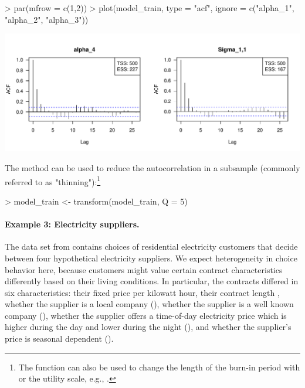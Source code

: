 \documentclass[article,shortnames]{jss}
\newcommand{\fct}[1]{\code{#1()}}
\begin{document}
\begin{Schunk}
\begin{Sinput}
> par(mfrow = c(1,2))
> plot(model_train, type = "acf", ignore = c("alpha_1", "alpha_2", "alpha_3"))
\end{Sinput}
\end{Schunk}
\includegraphics{rprobitb_oelschlaeger_bauer-model-train-acf}

The \fct{transform} method can be used to reduce the autocorrelation in a subsample (commonly referred to as "thinning"):\footnote{The function can also be used to change the length of the burn-in period with  or the utility scale, e.g., .}

\begin{Schunk}
\begin{Sinput}
> model_train <- transform(model_train, Q = 5)
\end{Sinput}
\end{Schunk}

\paragraph{Example 3: Electricity suppliers.}

The  data set from  contains choices of residential electricity customers that decide between four hypothetical electricity suppliers. We expect heterogeneity in choice behavior here, because customers might value certain contract characteristics differently based on their living conditions. In particular, the contracts differed in six characteristics: their fixed price  per kilowatt hour, their contract length , whether the supplier is a local company (), whether the supplier is a well known company (), whether the supplier offers a time-of-day electricity price which is higher during the day and lower during the night (), and whether the supplier's price is seasonal dependent ().
\end{document}
